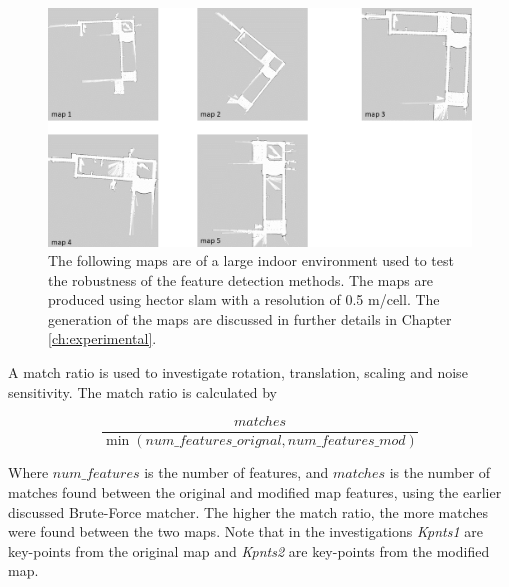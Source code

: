 \begin{figure}[H]
    \centering
    \includegraphics[width=1\textwidth]{figs/feature_images.png}
    \caption[Occupancy grid map examples of a large indoor environment]{The following maps are of a large indoor environment used to test the robustness of the feature detection methods. The maps are produced using hector slam with a resolution of 0.5 m/cell. The generation of the maps are discussed in further details in Chapter \ref{ch:experimental}.}
    \label{fig:maps}
\end{figure}

A match ratio is used to investigate rotation, translation, scaling and noise sensitivity. The match ratio is calculated by

\begin{equation}
    \frac{matches}{\min(num\_features\_orignal, num\_features\_mod)}
    \label{eg:nmatch_ratio}
\end{equation}

Where $num\_features$ is the number of features, and $matches$ is the number of matches found between the original and modified map features, using the earlier discussed Brute-Force matcher. The higher the match ratio, the more matches were found between the two maps. Note that in the investigations \textit{Kpnts1} are key-points from the original map and \textit{Kpnts2} are key-points from the modified map.

